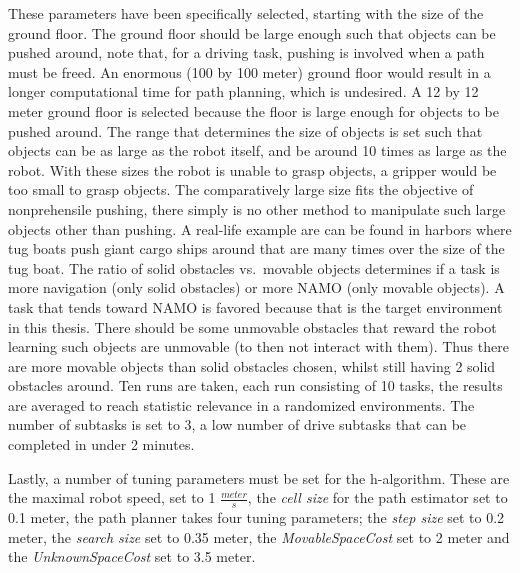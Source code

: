 These parameters have been specifically selected, starting with the size of the ground floor. The ground floor should be large enough such that objects can be pushed around, note that, for a driving task, pushing is involved when a path must be freed. An enormous (100 by 100 meter) ground floor would result in a longer computational time for path planning, which is undesired. A 12 by 12 meter ground floor is selected because the floor is large enough for objects to be pushed around. The range that determines the size of objects is set such that objects can be as large as the robot itself, and be around 10 times as large as the robot. With these sizes the robot is unable to grasp objects, a gripper would be too small to grasp objects. The comparatively large size fits the objective of nonprehensile pushing, there simply is no other method to manipulate such large objects other than pushing. A real-life example are can be found in harbors where tug boats push giant cargo ships around that are many times over the size of the tug boat. The ratio of solid obstacles vs.~movable objects determines if a task is more navigation (only solid obstacles) or more \ac{NAMO} (only movable objects). A task that tends toward \ac{NAMO} is favored because that is the target environment in this thesis. There should be some unmovable obstacles that reward the robot learning such objects are unmovable (to then not interact with them). Thus there are more movable objects than solid obstacles chosen, whilst still having 2 solid obstacles around. Ten runs are taken, each run consisting of 10 tasks, the results are averaged to reach statistic relevance in a randomized environments. The number of subtasks is set to 3, a low number of drive subtasks that can be completed in under 2 minutes.\bs

Lastly, a number of tuning parameters must be set for the \ac{h-algorithm}. These are the maximal robot speed, set to 1 $\frac{\mathit{meter}}{\mathit{s}}$, the \textit{cell size} for the path estimator set to 0.1 meter, the path planner takes four tuning parameters; the \textit{step size} set to 0.2 meter, the \textit{search size} set to 0.35 meter, the \textit{MovableSpaceCost} set to 2 meter and the \textit{UnknownSpaceCost} set to 3.5 meter.\bs

